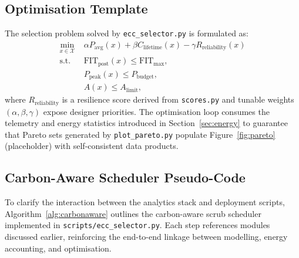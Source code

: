 \documentclass[conference]{IEEEtran}
\begin{document}
\subsection{Optimisation Template}
\label{sec:optimisation}
The selection problem solved by \texttt{ecc\_selector.py} is formulated as:
\begin{align}
\min_{x \in \mathcal{X}} & \; \alpha P_{\text{avg}}(x) + \beta C_{\text{lifetime}}(x) - \gamma R_{\text{reliability}}(x) \\
\text{s.t.} & \; \text{FIT}_{\text{post}}(x) \leq \text{FIT}_{\max},\\
& \; P_{\text{peak}}(x) \leq P_{\text{budget}},\\
& \; A(x) \leq A_{\text{limit}},
\end{align}
where $R_{\text{reliability}}$ is a resilience score derived from \texttt{scores.py} and tunable weights $(\alpha,\beta,\gamma)$ expose designer priorities.
The optimisation loop consumes the telemetry and energy statistics introduced in Section~\ref{sec:energy} to guarantee that Pareto sets generated by \texttt{plot\_pareto.py} populate Figure~\ref{fig:pareto} (placeholder) with self-consistent data products.

\subsection{Carbon-Aware Scheduler Pseudo-Code}
To clarify the interaction between the analytics stack and deployment scripts, Algorithm~\ref{alg:carbonaware} outlines the carbon-aware scrub scheduler implemented in \texttt{scripts/ecc\_selector.py}. Each step references modules discussed earlier, reinforcing the end-to-end linkage between modelling, energy accounting, and optimisation.
\end{document}
